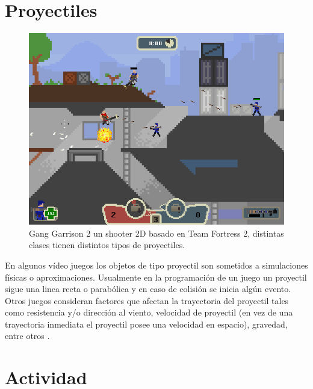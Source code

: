\section{Proyectiles}
\setlength\intextsep{0pt}
\begin{figure}
\includegraphics[width=\linewidth]{semana14/Gang_Garrison_2.png}
\caption{Gang Garrison 2 un shooter 2D basado en Team Fortress 2, distintas clases tienen distintos tipos de proyectiles.}
\label{fig:ganggarrison2}
\end{figure}

En algunos vídeo juegos los objetos de tipo proyectil son sometidos a simulaciones físicas o aproximaciones. Usualmente en la programación de un juego un proyectil sigue una linea recta o parabólica y en caso de colisión se inicia algún evento. Otros juegos consideran factores que afectan la trayectoria del proyectil tales como resistencia y/o dirección al viento, velocidad de proyectil (en vez de una trayectoria inmediata el proyectil posee una velocidad en espacio), gravedad, entre otros \cite{fifa_physics}.~\\

\section{Actividad}

